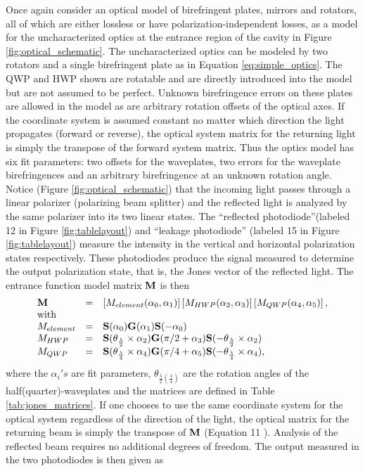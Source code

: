 Once again consider an optical model of birefringent plates, mirrors and rotators, all of which are either lossless or have polarization-independent losses, as a model for the uncharacterized optics at the entrance region of the cavity in Figure \ref{fig:optical_schematic}. The uncharacterized optics can be modeled by two rotators and a single birefringent plate as in Equation \ref{eq:simple_optics}. The QWP and HWP shown are rotatable and are directly introduced into the model but are not assumed to be perfect. Unknown birefringence errors on these plates are allowed in the model as are arbitrary rotation offsets of the optical axes. If the coordinate system is assumed constant no matter which direction the light propagates (forward or reverse), the optical system matrix for the returning light is simply the transpose of the forward system matrix. Thus the optics model has six fit parameters: two offsets for the waveplates, two errors for the waveplate birefringences and an arbitrary birefringence at an unknown rotation angle. Notice (Figure \ref{fig:optical_schematic}) that the incoming light passes through a linear polarizer (polarizing beam splitter) and the reflected light is analyzed by the same polarizer into its two linear states. The ``reflected photodiode''(labeled 12 in Figure \ref{fig:tablelayout}) and ``leakage photodiode'' (labeled 15 in Figure \ref{fig:tablelayout}) measure the intensity in the vertical and horizontal polarization states respectively. These photodiodes produce the signal measured to determine the output polarization state, that is, the Jones vector of the reflected light. The entrance function model matrix ${\bf M}$ is then
\begin{equation}
\begin{array}{lcl}
{\bf M}&=&\left[M_{element}(\alpha_0,\alpha_1)\right]\left[M_{HWP}(\alpha_2,\alpha_3)\right]\left[M_{QWP}(\alpha_4,\alpha_5)\right],\\
\text{with}&~&~\\
M_{element}&=&{\bf S}(\alpha_0){\bf G}(\alpha_1){\bf S}(-\alpha_0)\\
M_{HWP}&=&{\bf S}(\theta_{\frac{\lambda}{2}}\times\alpha_2){\bf G}(\pi/2 +\alpha_3){\bf S}(-\theta_{\frac{\lambda}{2}}\times\alpha_2)\\
M_{QWP}&=&{\bf S}(\theta_{\frac{\lambda}{4}}\times\alpha_4){\bf G}(\pi/4 +\alpha_5){\bf S}(-\theta_{\frac{\lambda}{4}}\times\alpha_4),\end{array}
\end{equation}
where the $\alpha_i's$ are fit parameters, $\theta_{\frac{\lambda}{2}(\frac{\lambda}{4})}$ are the rotation angles of the half(quarter)-waveplates and the matrices are defined in Table \ref{tab:jones_matrices}. If one chooses to use the same coordinate system for the optical system regardless of the direction of the light, the optical matrix for the returning beam is simply the transpose of ${\bf M}$ (Equation 11 \cite{Vansteenkiste}). Analysis of the reflected beam requires no additional degrees of freedom. The output measured in the two photodiodes is then given as
